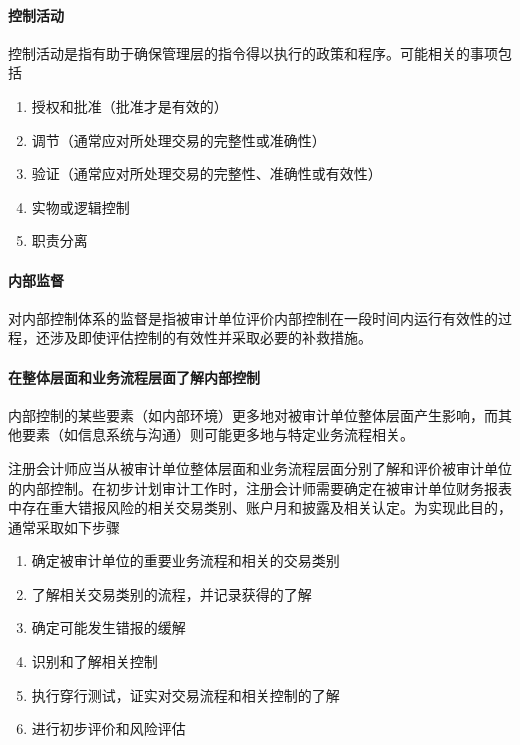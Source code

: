 \documentclass[UTF8,12pt]{ctexart}
\numberwithin{equation}{section} %
\numberwithin{figure}{section}
\numberwithin{table}{section}
\begin{document}
	\paragraph{控制活动}
	控制活动是指有助于确保管理层的指令得以执行的政策和程序。可能相关的事项包括
	\begin{enumerate}
		\item 授权和批准（批准才是有效的）
		
		\item 调节（通常应对所处理交易的完整性或准确性）
		
		\item 验证（通常应对所处理交易的完整性、准确性或有效性）
		
		\item 实物或逻辑控制
		
		\item 职责分离
	\end{enumerate}
	
	\paragraph{内部监督}
	对内部控制体系的监督是指被审计单位评价内部控制在一段时间内运行有效性的过程，还涉及即使评估控制的有效性并采取必要的补救措施。
	
	\paragraph{在整体层面和业务流程层面了解内部控制}
	内部控制的某些要素（如内部环境）更多地对被审计单位整体层面产生影响，而其他要素（如信息系统与沟通）则可能更多地与特定业务流程相关。
	
	注册会计师应当从被审计单位整体层面和业务流程层面分别了解和评价被审计单位的内部控制。在初步计划审计工作时，注册会计师需要确定在被审计单位财务报表中存在重大错报风险的相关交易类别、账户月和披露及相关认定。为实现此目的，通常采取如下步骤
	\begin{enumerate}
		\item 确定被审计单位的重要业务流程和相关的交易类别
		
		\item 了解相关交易类别的流程，并记录获得的了解
		
		\item 确定可能发生错报的缓解
		
		\item 识别和了解相关控制
		
		\item 执行穿行测试，证实对交易流程和相关控制的了解
		
		\item 进行初步评价和风险评估
	\end{enumerate}
	
\end{document}
